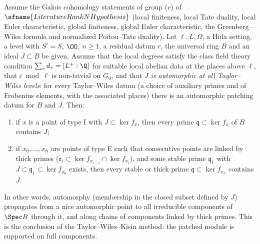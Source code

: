 \begin{theorem}[Patching]\label{pf:vwin:pfromaut}
Assume the Galois cohomology statements of group (c) of $\sfname{LiteratureRankNHypothesis}$ (local finiteness, local Tate duality, local Euler
characteristic, global finiteness, global Euler characteristic, the Greenberg--Wiles formula and normalized Poitou--Tate duality). Let
$\ell,L,\Omega$, a Hida setting, a level with $S'=S$, $\OO$, $n\ge1$, a residual datum $r$, the universal ring $B$ and an ideal $J\subset B$ be given.
Assume that the local degrees satisfy the class field theory condition $\sum_vd_v=[L^+:\Q]$ for suitable local abelian data at the places above $\ell$,
that $\varepsilon\bmod\ell$ is non-trivial on $G_0$, and that \emph{$J$ is automorphic at all Taylor--Wiles levels}: for every Taylor--Wiles datum (a
choice of auxiliary primes and of Frobenius elements, with the associated places) there is an automorphic patching datum for $B$ and $J$. Then:
\begin{enumerate}[label=(\alph*)]
\item if $x$ is a point of type I with $J\subset\ker f_x$, then every prime $\mathfrak q\subset\ker f_x$ of $B$ contains $J$;
\item if $x_0,\dots,x_h$ are points of type E such that consecutive points are linked by thick primes ($\mathfrak e_i\subset\ker f_{x_{i-1}}\cap\ker
f_{x_i}$), and some stable prime $\mathfrak q_1$ with $J\subset\mathfrak q_1\subset\ker f_{x_0}$ exists, then every stable or thick prime
$\mathfrak q\subset\ker f_{x_h}$ contains $J$.
\end{enumerate}
\end{theorem}

In other words, automorphy (membership in the closed subset defined by $J$) propagates from a nice automorphic point to all irreducible components of
$\Spec B$ through it, and along chains of components linked by thick primes. This is the conclusion of the Taylor--Wiles--Kisin method: the patched
module is supported on full components.

